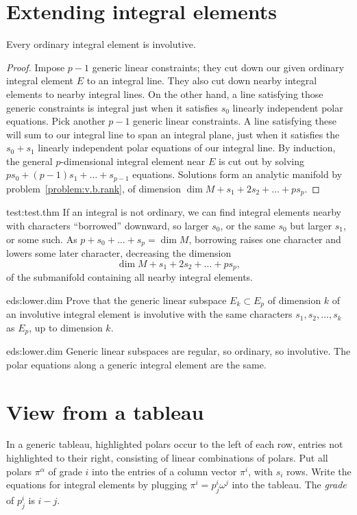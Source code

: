 \section{Extending integral elements}
\begin{lemma}\label{lemma:point.int.elements}
Every ordinary integral element is involutive.
\end{lemma}
\begin{proof}
Impose \(p-1\) generic linear constraints; they cut down our given ordinary integral element \(E\) to an integral line.
They also cut down nearby integral elements to nearby integral lines.
On the other hand, a line satisfying those generic constraints is integral just when it satisfies \(s_0\) linearly independent polar equations.
Pick another \(p-1\) generic linear constraints.
A line satisfying these will sum to our integral line to span an integral plane, just when it satisfies the \(s_0+s_1\) linearly independent polar equations of our integral line.
By induction, the general \(p\)-dimensional integral element near \(E\) is cut out by solving \(ps_0+(p-1)s_1+\dots+s_{p-1}\) equations.
Solutions form an analytic manifold by problem~\vref{problem:v.b.rank}, of dimension \(\dim M+s_1+2s_2+\dots+ps_p\).
\end{proof}
\begin{answer}{test:test.thm}
If an integral is not ordinary, we can find integral elements nearby with characters ``borrowed'' downward, so larger \(s_0\), or the same \(s_0\) but larger \(s_1\), or some such.
As \(p+s_0+\dots+s_p=\dim M\), borrowing raises one character and lowers some later character, decreasing the dimension 
\[
\dim M + s_1 + 2s_2 + \dots + ps_p,
\]
of the submanifold containing all nearby integral elements.
\end{answer}
\begin{problem}{eds:lower.dim}
Prove that the generic linear subspace \(E_k \subset E_p\) of dimension \(k\) of an involutive integral element is involutive with the same characters \(s_1,s_2,\dots,s_k\) as \(E_p\), up to dimension \(k\).
\end{problem}
\begin{answer}{eds:lower.dim}
Generic linear subspaces are regular, so ordinary, so involutive.
The polar equations along a generic integral element are the same.
\end{answer}

\section{View from a tableau}
In a generic tableau, highlighted polars occur to the left of each row, entries not highlighted to their right, consisting of linear combinations of polars.
Put all polars \(\pi^{\alpha}\) of grade \(i\) into the entries of a column vector \(\pi^i\), with \(s_i\) rows.
Write the equations for integral elements by plugging \(\pi^i=p^i_j\omega^j\) into the tableau.
The \emph{grade} of \(p^i_j\) is \(i-j\).

